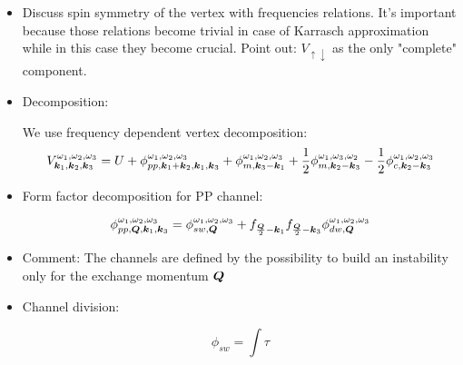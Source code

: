%
%
%

\begin{itemize}


\item Discuss spin symmetry of the vertex with frequencies relations. It's important because 
those relations become trivial in case of Karrasch approximation while in this case they become crucial. 
Point out: $V_{\uparrow \downarrow}$ as the only "complete" component.

\item Decomposition:

We use frequency dependent vertex decomposition:
\begin{equation}
V^{\omega_1,\omega_2,\omega_3}_{\boldsymbol{k}_1,\boldsymbol{k}_2,\boldsymbol{k}_3}  = U + 
  \phi^{\omega_1,\omega_2,\omega_3}_{pp,\boldsymbol{k}_1+\boldsymbol{k}_2,\boldsymbol{k}_1,\boldsymbol{k}_3} + \phi^{\omega_1,\omega_2,\omega_3}_{m,\boldsymbol{k}_3-\boldsymbol{k}_1} + \frac{1}{2} \phi^{\omega_1,\omega_3,\omega_2}_{m,\boldsymbol{k}_2-\boldsymbol{k}_3}
- \frac{1}{2} \phi^{\omega_1,\omega_2,\omega_3}_{c,\boldsymbol{k}_2-\boldsymbol{k}_3}
\end{equation}

\item Form factor decomposition for PP channel:

\begin{equation}
  \phi^{\omega_1,\omega_2,\omega_3}_{pp,\boldsymbol{Q},\boldsymbol{k}_1,\boldsymbol{k}_3}  =
    \phi_{sw,\boldsymbol{Q}}^{\omega_1,\omega_2,\omega_3} 
    + f_{\frac{\boldsymbol{Q}}{2}-\boldsymbol{k}_1} f_{\frac{\boldsymbol{Q}}{2}-\boldsymbol{k}_3} \phi_{dw,\boldsymbol{Q}}^{\omega_1,\omega_2,\omega_3} 
\end{equation}

\item Comment: The channels are defined by the possibility to build an instability only for the exchange 
   momentum $\boldsymbol{Q}$
   
\item Channel division:

\begin{equation}
\phi_{sw} = \int \tau 
\end{equation}

\end{itemize}

